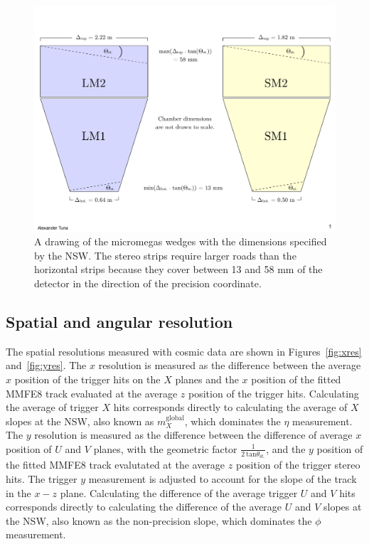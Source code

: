 \begin{figure}[!htpb]
  \begin{center}
    \includegraphics[width=1.0\textwidth]{figures/cartoons/stereo_roads.pdf}
  \end{center}
  \vspace{-10pt}
  \caption{A drawing of the micromegas wedges with the dimensions specified by the NSW. The stereo strips require larger roads than the horizontal strips because they cover between 13 and 58 mm of the detector in the direction of the precision coordinate.}
  \label{fig:stereo_roads}
\end{figure}

\subsection{Spatial and angular resolution}
\label{sec:perf-res}

The spatial resolutions measured with cosmic data are shown in Figures~\ref{fig:xres} and~\ref{fig:yres}. The $x$ resolution is measured as the difference between the average $x$ position of the trigger hits on the $X$ planes and the $x$ position of the fitted MMFE8 track evaluated at the average $z$ position of the trigger hits. Calculating the average of trigger $X$ hits corresponds directly to calculating the average of $X$ slopes at the NSW, also known as $m_X^\text{global}$, which dominates the $\eta$ measurement. The $y$ resolution is measured as the difference between the difference of average $x$ position of $U$ and $V$ planes, with the geometric factor $\frac{1}{2\ \text{tan}\theta_\text{st.}}$, and the $y$ position of the fitted MMFE8 track evalutated at the average $z$ position of the trigger stereo hits. The trigger $y$ measurement is adjusted to account for the slope of the track in the $x-z$ plane. Calculating the difference of the average trigger $U$ and $V$ hits corresponds directly to calculating the difference of the average $U$ and $V$ slopes at the NSW, also known as the non-precision slope, which dominates the $\phi$ measurement.

